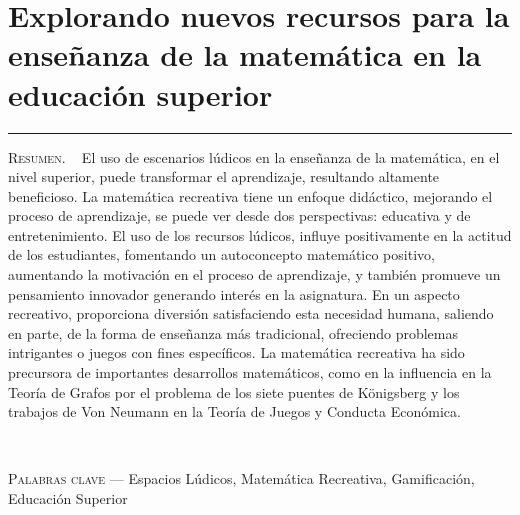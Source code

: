 \thispagestyle{portadapage}
\setcounter{subsection}{0}
\setcounter{subsubsection}{0}
\setcounter{actividad}{0}
\setcounter{actividad_previa}{0}
\setcounter{actividad_entre}{0}
\renewcommand{\articulotipo}{Comunicación breve}
\renewcommand{\articulotitulo}{Explorando nuevos recursos para la enseñanza de la matemática en la educación superior}
\renewcommand{\articulotitulocorto}{Explorando nuevos recursos para la enseñanza de la matemática en la educación superior}
\section{\articulotitulo}

\noindent\rule{\linewidth}{2pt}

\vspace{0.25cm}

\begin{flushright}
	\vspace{1em}
\end{flushright}

\vspace{0.5cm}

\begin{center}
	\begin{minipage}{0.75\linewidth} \small
		\textsc{Resumen}. ~
		El uso de escenarios lúdicos en la enseñanza de la matemática, en el nivel superior, puede transformar el aprendizaje, resultando altamente beneficioso. La matemática recreativa tiene un enfoque didáctico, mejorando el proceso de aprendizaje, se puede ver desde dos perspectivas: educativa y de entretenimiento. El uso de los recursos lúdicos, influye positivamente en la actitud de los estudiantes, fomentando un autoconcepto matemático positivo, aumentando la motivación en el proceso de aprendizaje, y también promueve un pensamiento innovador generando interés en la asignatura. En un aspecto recreativo, proporciona diversión satisfaciendo esta necesidad humana, saliendo en parte, de la forma de enseñanza más tradicional, ofreciendo problemas intrigantes o juegos con fines específicos. La matemática recreativa ha sido precursora de importantes desarrollos matemáticos, como en la influencia en la Teoría de Grafos por el problema de los siete puentes de Königsberg y los trabajos de Von Neumann en la Teoría de Juegos y Conducta Económica.
	\end{minipage}\\
	
	\vspace{0.5em}
	
	\begin{minipage}{0.75\linewidth} \small
		\textsc{Palabras clave} --- Espacios Lúdicos, Matemática Recreativa, Gamificación, Educación Superior
	\end{minipage}
\end{center}

